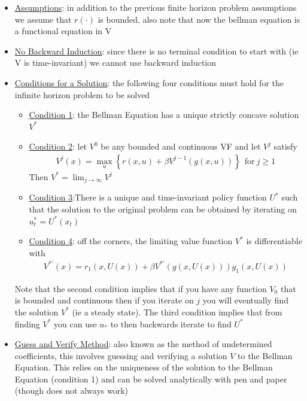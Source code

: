 \documentclass{article}
\begin{document}
\begin{itemize}
    \item \underline{Assumptions}: in addition to the previous finite horizon problem assumptions we assume that $r(\cdot)$ is bounded, also note that now the bellman equation is a functional equation in V
    \item  \underline{No Backward Induction}: since there is no terminal condition to start with (ie V is time-invariant) we cannot use backward induction
    \item \underline{Conditions for a Solution}: the following four conditions must hold for the infinite horizon problem to be solved
    \begin{itemize}
        \item \underline{Condition 1}: the Bellman Equation has a unique strictly concave solution $V^{*}$
        \item \underline{Condition 2}: let $V^{0}$ be any bounded and continuous VF and let $V^{j}$ satisfy
        \begin{gather*}
            V^{j}(x) = \max_{u} \left\{ r(x,u) + \beta V^{j-1}(g(x,u)) \right\} \ \ \text{for} \ j \geq 1
        \end{gather*}
        Then $V^{*} = \lim_{j \rightarrow \infty} V^{j}$
        \item \underline{Condition 3}:There is a unique and time-invariant policy function $U^{*}$ such that the solution to the original problem can be obtained by iterating on $u^{*}_{t} = U^{*}(x_{t})$
        \item \underline{Condition 4}: off the corners, the limiting value function $V^{*}$ is differentiable with
        \begin{gather*}
            V^{*'}(x) = r_{1}(x, U(x)) + \beta V^{*'}(g(x,U(x)))g_{1}(x,U(x))
        \end{gather*}
    \end{itemize}
    Note that the second condition implies that if you have any function $V_{0}$ that is bounded and continuous then if you iterate on $j$ you will eventually find the solution $V^{*}$ (ie a steady state). The third condition implies that from finding $V^{*}$ you can use $u_{*}$ to then backwards iterate to find $U^{*}$
    \item  \underline{Guess and Verify Method}: also known as the method of undetermined coefficients, this involves guessing and verifying a solution $V$ to the Bellman Equation. This relies on the uniqueness of the solution to the Bellman Equation (condition 1) and can be solved analytically with pen and paper (though does not always work)

\end{itemize}
\end{document}
